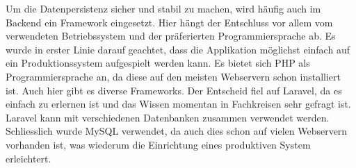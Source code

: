 Um die Datenpersistenz sicher und stabil zu machen, wird häufig auch im Backend ein Framework eingesetzt. Hier hängt der Entschluss vor allem vom verwendeten Betriebssystem und der präferierten Programmiersprache ab. Es wurde in erster Linie darauf geachtet, dass die Applikation möglichst einfach auf ein Produktionssystem aufgespielt werden kann. Es bietet sich PHP als Programmiersprache an, da diese auf den meisten Webservern schon installiert ist. Auch hier gibt es diverse Frameworks. Der Entscheid fiel auf Laravel, da es einfach zu erlernen ist und das Wissen momentan in Fachkreisen sehr gefragt ist. Laravel kann mit verschiedenen Datenbanken zusammen verwendet werden. Schliesslich wurde MySQL verwendet, da auch dies schon auf vielen Webservern vorhanden ist, was wiederum die Einrichtung eines produktiven System erleichtert. 